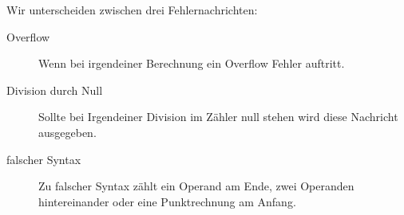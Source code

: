 Wir unterscheiden zwischen drei Fehlernachrichten:
\begin{description}
 \item[Overflow] Wenn bei irgendeiner Berechnung ein Overflow Fehler auftritt. 
 \item[Division durch Null] Sollte bei Irgendeiner Division im Zähler null stehen wird diese Nachricht ausgegeben.
 \item[falscher Syntax]Zu falscher Syntax zählt ein Operand am Ende, zwei Operanden hintereinander oder eine Punktrechnung am Anfang.
\end{description}